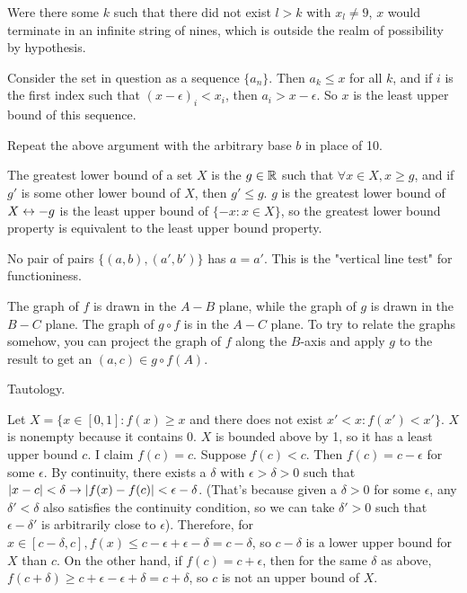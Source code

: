 \documentclass[11pt, oneside]{article}   	%
\begin{document}
\item Were there some $k$ such that there did not exist $l > k$ with $x_l \not = 9$, $x$ would terminate in an infinite string of nines, which is outside the realm of possibility by hypothesis.
\item Consider the set in question as a sequence $\{a_n\}$. Then $a_k \le x$ for all $k$, and if $i$ is the first index such that $(x-\epsilon)_i < x_i$, then $a_i > x - \epsilon$. So $x$ is the least upper bound of this sequence.
\item Repeat the above argument with the arbitrary base $b$ in place of 10.
\ee
\item The greatest lower bound of a set $X$ is the $g \in \mathbb{R}$ such that $\forall x \in X, x \ge g$, and if $g'$ is some other lower bound of $X$, then $g' \le g$. $g$ is the greatest lower bound of $X \leftrightarrow -g$ is the least upper bound of $\{-x: x \in X\}$, so the greatest lower bound property is equivalent to the least upper bound property.
\item \be
\item No pair of pairs $\{(a, b), (a', b')\}$ has $a=a'$. This is the "vertical line test" for functioniness.
\item The graph of $f$ is drawn in the $A-B$ plane, while the graph of $g$ is drawn in the $B-C$ plane. The graph of $g \circ f$ is in the $A-C$ plane. To try to relate the graphs somehow, you can project the graph of $f$ along the $B$-axis and apply $g$ to the result to get an $(a, c) \in g \circ f(A)$.
\ee
\item \be
\item Tautology.
\item Let $X = \{x \in [0, 1]: f(x) \ge x$ and there does not exist $x' < x: f(x') < x'\}$. $X$ is nonempty because it contains 0. $X$ is bounded above by 1, so it has a least upper bound $c$. I claim $f(c) = c$. Suppose $f(c) < c$. Then $f(c) = c - \epsilon$ for some $\epsilon$. By continuity, there exists a $\delta$ with $\epsilon > \delta > 0$ such that $|x-c| < \delta \rightarrow |f(x) - f(c)| < \epsilon - \delta$. (That's because given a $\delta > 0$ for some $\epsilon$, any $\delta' < \delta$ also satisfies the continuity condition, so we can take $\delta' > 0$ such that $\epsilon - \delta'$ is arbitrarily close to $\epsilon$). Therefore, for $x \in [c - \delta, c], f(x) \le c - \epsilon + \epsilon - \delta = c - \delta$, so $c- \delta$ is a lower upper bound for $X$ than $c$. On the other hand, if $f(c) = c + \epsilon$, then for the same $\delta$ as above, $f(c + \delta) \ge c + \epsilon - \epsilon + \delta = c + \delta$, so $c$ is not an upper bound of $X$. 
\end{document}
